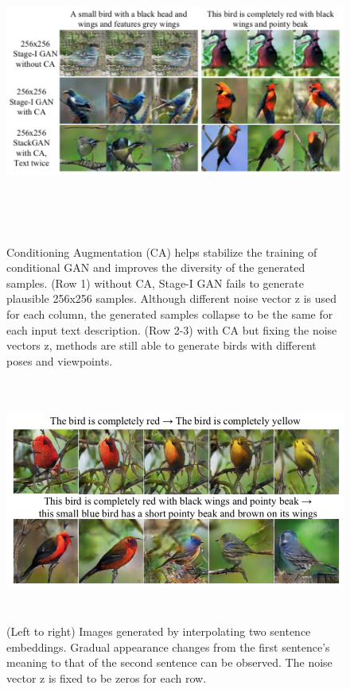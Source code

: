 \documentclass[a4paper,12pt,oneside]{article}
\begin{document}
\begin{figure}[H]
\centering
\includegraphics[height=10cm,width=15cm]{Figure7.png}
\caption[Conditioning Augmentation]{Conditioning Augmentation (CA) helps stabilize the training of conditional GAN and improves the diversity of the generated samples. (Row 1) without CA, Stage-I GAN fails to generate plausible 256x256 samples. Although different noise vector z is used for each column, the generated samples collapse to be the same for each input text description. (Row 2-3) with CA but fixing the noise vectors z, methods are still able to generate birds with different poses and viewpoints.}
\end{figure}

\begin{figure}[H]
\centering
\includegraphics[height=8cm,width=15cm]{Figure8.png}
\caption[ Images generated by interpolating two sentence embeddings]{(Left to right) Images generated by interpolating two sentence embeddings. Gradual appearance changes from the first sentence’s meaning to that of the second sentence can be observed. The noise vector z is fixed to be zeros for each row.}
\end{figure}
\end{document}
